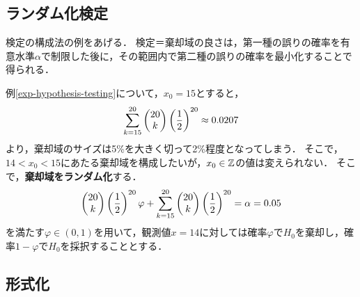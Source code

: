 \documentclass[uplatex,dvipdfmx]{jsreport}
\begin{document}
\subsection{ランダム化検定}

\begin{tcolorbox}[colframe=ForestGreen, colback=ForestGreen!10!white,breakable,colbacktitle=ForestGreen!40!white,coltitle=black,fonttitle=\bfseries\sffamily,
title=]
    検定の構成法の例をあげる．
    検定＝棄却域の良さは，第一種の誤りの確率を有意水準$\alpha$で制限した後に，その範囲内で第二種の誤りの確率を最小化することで得られる．
\end{tcolorbox}

\begin{example}
    例\ref{exp-hypothesis-testing}について，$x_0=15$とすると，
    \[\sum^{20}_{k=15}\begin{pmatrix}20\\k\end{pmatrix}\left(\frac{1}{2}\right)^{20}\approx 0.0207\]
    より，棄却域のサイズは5\%を大きく切って2\%程度となってしまう．
    そこで，$14<x_0<15$にあたる棄却域を構成したいが，$x_0\in\mathbb{Z}$の値は変えられない．
    そこで，\textbf{棄却域をランダム化}する．
    \[\begin{pmatrix}20\\k\end{pmatrix}\left(\frac{1}{2}\right)^{20}\varphi+\sum^{20}_{k=15}\begin{pmatrix}20\\k\end{pmatrix}\left(\frac{1}{2}\right)^{20}=\alpha=0.05\]
    を満たす$\varphi\in(0,1)$を用いて，観測値$x=14$に対しては確率$\varphi$で$H_0$を棄却し，確率$1-\varphi$で$H_0$を採択することとする．
\end{example}

\subsection{形式化}
\end{document}
